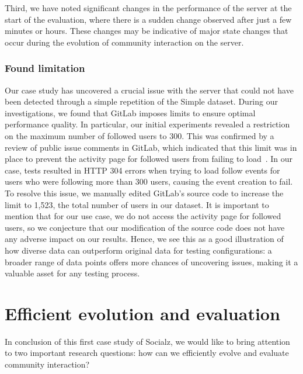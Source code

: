 \documentclass[dvipsnames,format=sigconf,anonymous=False,review=false, balance=false]{acmart}
\begin{document}
Third, we have noted significant changes in the performance of the server at the start of the evaluation, where there is a sudden change observed after just a few minutes or hours. These changes may be indicative of major state changes that occur during the evolution of community interaction on the server.

\subsubsection{Found limitation}

Our case study has uncovered a crucial issue with the server that could not have been detected through a simple repetition of the Simple dataset. During our investigations, we found that GitLab imposes limits to ensure optimal performance quality. In particular, our initial experiments revealed a restriction on the maximum number of followed users to 300. This was confirmed by a review of public issue comments in GitLab, which indicated that this limit was in place to prevent the activity page for followed users from failing to load~\cite{Issue360755}. In our case,  tests resulted in HTTP 304 errors when trying to load follow events for users who were following more than 300 users, causing the event creation to fail. 
To resolve this issue, we manually edited GitLab's source code to increase the limit to 1,523, the total number of users in our dataset. 
It is important to mention that for our use case, we do not access the activity page for followed users, so we conjecture that our modification of the source code does not have any adverse impact on our results. Hence, we see this as a good illustration of how diverse data can outperform original data for testing configurations: a broader range of data points offers more chances of uncovering issues, making it a valuable asset for any testing process.

\section{Efficient evolution and evaluation}

In conclusion of this first case study of Socialz, we would like to bring attention to two important research questions: how can we efficiently evolve and evaluate community interaction?
\end{document}
